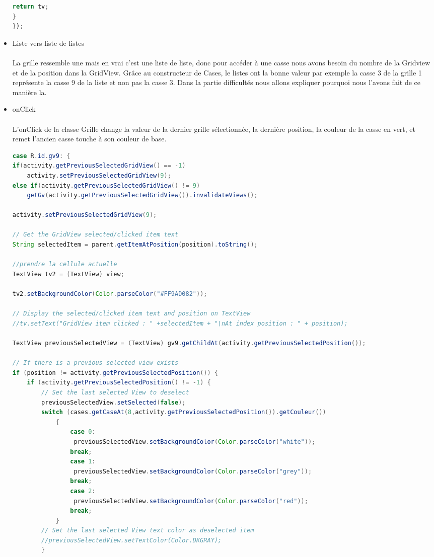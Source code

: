 \documentclass{article}
\begin{document}
\begin{itemize}
\begin{lstlisting}[language=Java, caption = Exemple setAdapter]
return tv;
}
});
\end{lstlisting}
\item{Liste vers liste de listes}
\\
\\
La grille ressemble une mais en vrai c’est une liste de liste, donc pour accéder à une casse nous avons besoin du nombre de la Gridview et de la position dans la GridView.  Grâce au constructeur de Cases, le  listes ont la bonne valeur par exemple la casse 3 de la grille 1 représente la casse 9 de la liste et non pas la casse 3. Dans la partie difficultés nous allons expliquer pourquoi nous l'avons fait de ce manière la.

\item{onClick}
\\
\\
L'onClick de la classe Grille change la valeur de la dernier grille sélectionnée, la dernière position, la couleur de la casse en vert, et remet l'ancien casse touche à son couleur de base. 



\begin{lstlisting}[language=Java, caption = Exemple d'une methode dans onclick] 
case R.id.gv9: {
if(activity.getPreviousSelectedGridView() == -1)                    
    activity.setPreviousSelectedGridView(9);
else if(activity.getPreviousSelectedGridView() != 9)
    getGv(activity.getPreviousSelectedGridView()).invalidateViews();

activity.setPreviousSelectedGridView(9);

// Get the GridView selected/clicked item text
String selectedItem = parent.getItemAtPosition(position).toString();

//prendre la cellule actuelle
TextView tv2 = (TextView) view;

tv2.setBackgroundColor(Color.parseColor("#FF9AD082"));

// Display the selected/clicked item text and position on TextView
//tv.setText("GridView item clicked : " +selectedItem + "\nAt index position : " + position);

TextView previousSelectedView = (TextView) gv9.getChildAt(activity.getPreviousSelectedPosition());

// If there is a previous selected view exists
if (position != activity.getPreviousSelectedPosition()) {
    if (activity.getPreviousSelectedPosition() != -1) {
        // Set the last selected View to deselect
        previousSelectedView.setSelected(false);
        switch (cases.getCaseAt(8,activity.getPreviousSelectedPosition()).getCouleur())
            {
                case 0:
                 previousSelectedView.setBackgroundColor(Color.parseColor("white"));
                break;
                case 1:
                 previousSelectedView.setBackgroundColor(Color.parseColor("grey"));
                break;
                case 2:
                 previousSelectedView.setBackgroundColor(Color.parseColor("red"));
                break;
            }
        // Set the last selected View text color as deselected item
        //previousSelectedView.setTextColor(Color.DKGRAY);
        }


\end{lstlisting}
\end{itemize}
\end{document}
